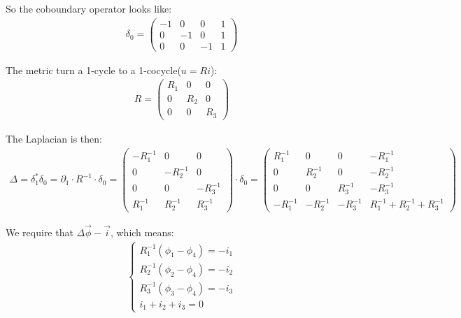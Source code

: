 \documentclass[]{ctexart}
\begin{document}
		So the coboundary operator looks like:
			\begin{equation*}
			\begin{aligned}
			\delta_0=
				\begin{pmatrix}
					-1 & 0 & 0 & 1\\
					0 & -1 & 0 & 1\\
					0 & 0 & -1 & 1
				\end{pmatrix}
			\end{aligned}
			\end{equation*}
			
		The metric turn a 1-cycle to a 1-cocycle($u=Ri$):
			\begin{equation*}
			\begin{aligned}
				R=
				\begin{pmatrix}
					R_1 & 0 & 0\\
					0 & R_2 & 0\\
					0 & 0 & R_3
				\end{pmatrix}
			\end{aligned}
			\end{equation*}
			
		The Laplacian is then:
			\begin{equation*}
			\begin{aligned}
				\Delta=\delta_{1}^{*} \delta_{0}=\partial_{1} \cdot R^{-1} \cdot \delta_{0}=\left(\begin{array}{ccc}
				-R_{1}^{-1} & 0 & 0 \\
				0 & -R_{2}^{-1} & 0 \\
				0 & 0& -R_{3}^{-1} \\
				R_{1}^{-1} & R_{2}^{-1} & R_{3}^{-1}
				\end{array}\right) \cdot \delta_{0}=\left(\begin{array}{cccc}
				R_{1}^{-1} & 0 & 0 & -R_{1}^{-1} \\
				0 & R_{2}^{-1} & 0 & -R_{2}^{-1} \\
				0 & 0 & R_{3}^{-1} & -R_{3}^{-1} \\
				-R_{1}^{-1}&-R_{2}^{-1}&-R_{3}^{-1} & R_{1}^{-1}+R_{2}^{-1}+R_{3}^{-1}
				\end{array}\right)
			\end{aligned}
			\end{equation*}
			
		We require that $\Delta \vec{\phi}-\vec{i}$, which means:
			\begin{equation*}
			\begin{aligned}
				\left\{\begin{array}{l}
				R_{1}^{-1}\left(\phi_{1}-\phi_{4}\right)=-i_{1} \\
				R_{2}^{-1}\left(\phi_{2}-\phi_{4}\right)=-i_{2} \\
				R_{3}^{-1}\left(\phi_{3}-\phi_{4}\right)=-i_{3} \\
				i_{1}+i_{2}+i_{3}=0
				\end{array}\right.
			\end{aligned}
			\end{equation*}
			
\end{document}
